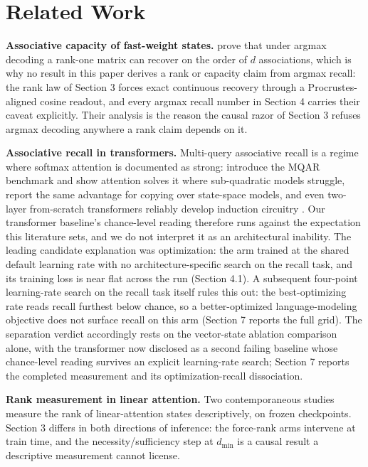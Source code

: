 \section{Related Work}

\textbf{Associative capacity of fast-weight states.} \citet{nichani2024understandingfactualrecalltransformers} prove that under argmax decoding a rank-one matrix can
recover on the order of $d$ associations, which is why no result in
this paper derives a rank or capacity claim from argmax recall: the
rank law of Section 3 forces exact continuous recovery through a
Procrustes-aligned cosine readout, and every argmax recall number in
Section 4 carries their caveat explicitly. Their analysis is the reason
the causal razor of Section 3 refuses argmax decoding anywhere a rank
claim depends on it.

\textbf{Associative recall in transformers.} Multi-query associative recall
is a regime where softmax attention is documented as strong: \citet{arora2023zoologymeasuringimprovingrecall} introduce the MQAR benchmark and show attention solves it
where sub-quadratic models struggle, \citet{jelassi2024repeatmetransformersbetter} report the
same advantage for copying over state-space models, and even two-layer
from-scratch transformers reliably develop induction circuitry
\citep{olsson2022incontextlearninginductionheads}. Our transformer baseline's chance-level reading
therefore runs against the expectation this literature sets, and we do
not interpret it as an architectural inability. The leading candidate
explanation was optimization: the arm trained at the shared default
learning rate with no architecture-specific search on the recall task,
and its training loss is near flat across the run (Section 4.1). A
subsequent four-point learning-rate search on the recall task itself
rules this out: the best-optimizing rate reads recall furthest below
chance, so a better-optimized language-modeling objective does not
surface recall on this arm (Section 7 reports the full grid). The
separation verdict accordingly rests on the vector-state ablation
comparison alone, with the transformer now disclosed as a second
failing baseline whose chance-level reading survives an explicit
learning-rate search; Section 7 reports the completed measurement and
its optimization-recall dissociation.

\textbf{Rank measurement in linear attention.} Two contemporaneous studies
\citep{nazari2026keystatereductionlinear,sun2026staterankdynamicslinear} measure the rank of
linear-attention states descriptively, on frozen checkpoints. Section 3
differs in both directions of inference: the force-rank arms intervene
at train time, and the necessity/sufficiency step at $d_{\min}$ is a
causal result a descriptive measurement cannot license.

